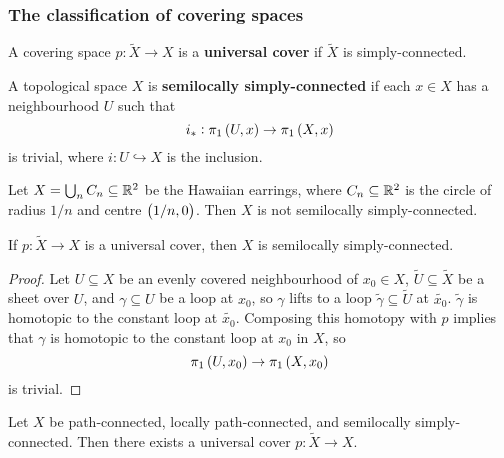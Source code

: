 
\subsubsection{The classification of covering spaces}

\begin{definition*}
A covering space $ p : \widetilde{X} \to X $ is a \textbf{universal cover} if $ \widetilde{X} $ is simply-connected.
\end{definition*}

\begin{definition*}
A topological space $ X $ is \textbf{semilocally simply-connected} if each $ x \in X $ has a neighbourhood $ U $ such that
$$ i_* : \pi_1\br{U, x} \to \pi_1\br{X, x} $$
is trivial, where $ i : U \hookrightarrow X $ is the inclusion.
\end{definition*}

\begin{example*}
Let $ X = \bigcup_n C_n \subseteq \mathbb{R}^2 $ be the Hawaiian earrings, where $ C_n \subseteq \mathbb{R}^2 $ is the circle of radius $ 1 / n $ and centre $ \br{1 / n, 0} $. Then $ X $ is not semilocally simply-connected.
\end{example*}

\begin{proposition}
If $ p : \widetilde{X} \to X $ is a universal cover, then $ X $ is semilocally simply-connected.
\end{proposition}

\begin{proof}
Let $ U \subseteq X $ be an evenly covered neighbourhood of $ x_0 \in X $, $ \widetilde{U} \subseteq \widetilde{X} $ be a sheet over $ U $, and $ \gamma \subseteq U $ be a loop at $ x_0 $, so $ \gamma $ lifts to a loop $ \widetilde{\gamma} \subseteq \widetilde{U} $ at $ \widetilde{x_0} $. $ \widetilde{\gamma} $ is homotopic to the constant loop at $ \widetilde{x_0} $. Composing this homotopy with $ p $ implies that $ \gamma $ is homotopic to the constant loop at $ x_0 $ in $ X $, so
$$ \pi_1\br{U, x_0} \to \pi_1\br{X, x_0} $$
is trivial.
\end{proof}

\pagebreak

\begin{theorem}
Let $ X $ be path-connected, locally path-connected, and semilocally simply-connected. Then there exists a universal cover $ p : \widetilde{X} \to X $.
\end{theorem}

